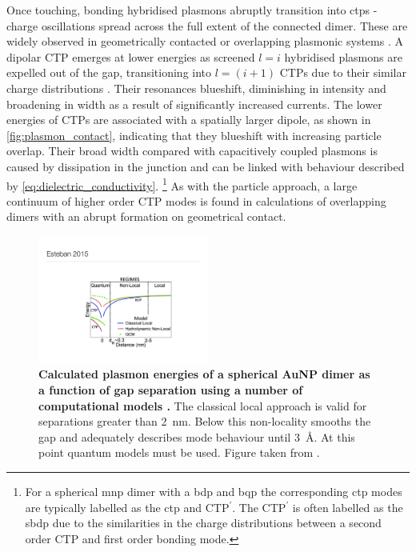 \documentclass{article}
\begin{document}
Once touching, bonding hybridised plasmons abruptly transition into \glspl{ctp} - charge oscillations spread across the full extent of the connected dimer. These are widely observed in geometrically contacted or overlapping plasmonic systems \cite{atay2004, lassiter2008}. A dipolar CTP emerges at lower energies as screened $l=i$ hybridised plasmons are expelled out of the gap, transitioning into $l=(i+1)$ CTPs due to their similar charge distributions \cite{romero2006, perez2010, perez2011, tserkezis2014}. Their resonances blueshift, diminishing in intensity and broadening in width as a result of significantly increased currents. The lower energies of CTPs are associated with a spatially larger dipole, as shown in \autoref{fig:plasmon_contact}, indicating that they blueshift with increasing particle overlap. Their broad width compared with capacitively coupled plasmons is caused by dissipation in the junction and can be linked with behaviour described by \eqref{eq:dielectric_conductivity}.%
\footnote{For a spherical \gls{mnp} dimer with a \gls{bdp} and \gls{bqp} the corresponding \gls{ctp} modes are typically labelled as the \gls{ctp} and CTP$^\prime$. The CTP$^\prime$ is often labelled as the \gls{sbdp} due to the similarities in the charge distributions between a second order CTP and first order bonding mode.} As with the particle approach, a large continuum of higher order CTP modes is found in calculations of overlapping dimers with an abrupt formation on geometrical contact.

\begin{figure}[bt]
\centering
\includegraphics[width=0.5\textwidth]{figures/literature/esteban2015a}
\caption[Calculated plasmon energies of a spherical AuNP dimer as a function of gap separation using a number of computational models \cite{esteban2015}]{\textbf{Calculated plasmon energies of a spherical AuNP dimer as a function of gap separation using a number of computational models \cite{esteban2015}.} The classical local approach is valid for separations greater than \SI{2}{nm}. Below this non-locality smooths the gap and adequately describes mode behaviour until \SI{3}{\angstrom}. At this point quantum models must be used. Figure taken from \cite{esteban2015}.}
\label{fig:model_comparison}
\end{figure}
\end{document}
